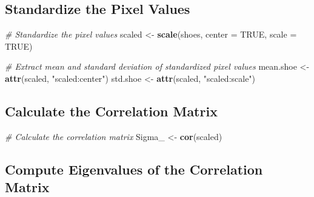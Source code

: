 \documentclass[
]{article}
\newenvironment{Shaded}{\begin{snugshade}}{\end{snugshade}}
\newcommand{\AttributeTok}[1]{\textcolor[rgb]{0.13,0.29,0.53}{#1}}
\newcommand{\CommentTok}[1]{\textcolor[rgb]{0.56,0.35,0.01}{\textit{#1}}}
\newcommand{\ConstantTok}[1]{\textcolor[rgb]{0.56,0.35,0.01}{#1}}
\newcommand{\FunctionTok}[1]{\textcolor[rgb]{0.13,0.29,0.53}{\textbf{#1}}}
\newcommand{\NormalTok}[1]{#1}
\newcommand{\OtherTok}[1]{\textcolor[rgb]{0.56,0.35,0.01}{#1}}
\newcommand{\SpecialCharTok}[1]{\textcolor[rgb]{0.81,0.36,0.00}{\textbf{#1}}}
\newcommand{\StringTok}[1]{\textcolor[rgb]{0.31,0.60,0.02}{#1}}
\begin{document}
\hypertarget{standardize-the-pixel-values}{%
\subsection{Standardize the Pixel
Values}\label{standardize-the-pixel-values}}

\begin{Shaded}
\begin{Highlighting}[]
\CommentTok{\# Standardize the pixel values}
\NormalTok{scaled }\OtherTok{\textless{}{-}} \FunctionTok{scale}\NormalTok{(shoes, }\AttributeTok{center =} \ConstantTok{TRUE}\NormalTok{, }\AttributeTok{scale =} \ConstantTok{TRUE}\NormalTok{)}

\CommentTok{\# Extract mean and standard deviation of standardized pixel values}
\NormalTok{mean.shoe }\OtherTok{\textless{}{-}} \FunctionTok{attr}\NormalTok{(scaled, }\StringTok{"scaled:center"}\NormalTok{)}
\NormalTok{std.shoe }\OtherTok{\textless{}{-}} \FunctionTok{attr}\NormalTok{(scaled, }\StringTok{"scaled:scale"}\NormalTok{)}
\end{Highlighting}
\end{Shaded}

\hypertarget{calculate-the-correlation-matrix}{%
\subsection{Calculate the Correlation
Matrix}\label{calculate-the-correlation-matrix}}

\begin{Shaded}
\begin{Highlighting}[]
\CommentTok{\# Calculate the correlation matrix}
\NormalTok{Sigma\_ }\OtherTok{\textless{}{-}} \FunctionTok{cor}\NormalTok{(scaled)}
\end{Highlighting}
\end{Shaded}

\hypertarget{compute-eigenvalues-of-the-correlation-matrix}{%
\subsection{Compute Eigenvalues of the Correlation
Matrix}\label{compute-eigenvalues-of-the-correlation-matrix}}

\begin{Shaded}
\end{Shaded}
\end{document}
